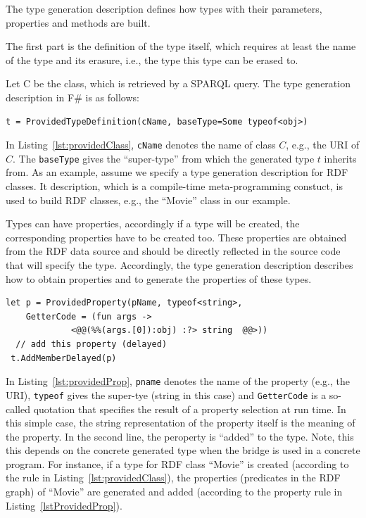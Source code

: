 \documentclass{llncs} %
\newcommand{\fs}{\textsf{F\#}\xspace}
\begin{document}
The type generation description defines how types with their parameters,
properties and methods are built.

The first part is the definition of the type itself, which requires at least the
name of the type and its erasure, i.e., the type this type can be erased to.

Let C be the class, which is retrieved by a SPARQL query. The type generation description in \fs
is as follows:

\begin{lstlisting}[style=code, caption={\textbf{Type Rule:} Type Generation Description for RDF Class C}, label={lst:providedClass}]
t = ProvidedTypeDefinition(cName, baseType=Some typeof<obj>)
\end{lstlisting}

In Listing~\ref{lst:providedClass}, \texttt{cName} denotes the name of class $C$, e.g., the URI of $C$.
The \texttt{baseType} gives the ``super-type'' from which the generated type $t$ inherits from.
As an example, assume we specify a type generation description for RDF classes.
It description, which is a compile-time meta-programming constuct, is
used to build RDF classes, e.g., the ``Movie'' class in our example.


Types can have properties, accordingly if a type will be created, the corresponding properties
have to be created too. These properties are obtained from the RDF data source and should
be directly reflected in the source code that will specify the type.
Accordingly, the type generation description describes how to obtain properties and to
generate the properties of these types.

\begin{lstlisting}[style=code, caption={\texttt{Property Rule:} Add Property for Class C}, label={lst:providedProp}]
 let p = ProvidedProperty(pName, typeof<string>, 
    GetterCode = (fun args -> 
		     <@@(%%(args.[0]):obj) :?> string  @@>))
  // add this property (delayed)
 t.AddMemberDelayed(p)
 \end{lstlisting}

In Listing~\ref{lst:providedProp}, \texttt{pname} denotes the name of the property (e.g., the URI), \texttt{typeof} gives the
super-tye (string in this case) and \texttt{GetterCode} is a so-called quotation that specifies the result of a property selection at run time.
In this simple case, the string representation of the property itself is the meaning of the property.
In the second line, the peroperty is ``added'' to the type. Note, this this depends on the concrete generated type 
when the bridge is used in a concrete program. For instance, if a type for RDF class ``Movie'' is created (according to the rule in Listing~\ref{lst:providedClass}),
the properties (predicates in the RDF graph) of ``Movie'' are generated and added (according to the property rule in Listing~\ref{lstProvidedProp}).
\end{document}
